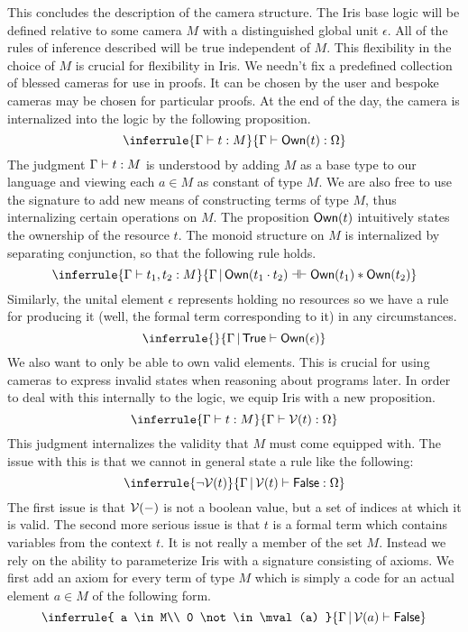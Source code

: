 \documentclass{amsart}
\newcommand{\provesJ}[3]{#1 \mathop{\vert} #2 \proves #3}
\newcommand{\provesIffJ}[3]{#1 \mathop{\vert} #2 \provesIff #3}
\begin{document}
This concludes the description of the camera structure. The Iris base
logic will be defined relative to some camera $M$ with a distinguished
global unit $\epsilon$. All of the rules of inference described will
be true independent of $M$. This flexibility in the choice of $M$ is
crucial for flexibility in Iris. We needn't fix a predefined
collection of blessed cameras for use in proofs. It can be chosen by
the user and bespoke cameras may be chosen for particular proofs. At
the end of the day, the camera is internalized into the logic by the
following proposition.
\[
  \inferrule{
    \Gamma \proves t : M
  }{\Gamma \proves \ownM{t} : \Omega}
\]
The judgment $\Gamma \vdash t : M$ is understood by adding $M$ as a
base type to our language and viewing each $a \in M$ as constant of
type $M$. We are also free to use the signature to add new means of
constructing terms of type $M$, thus internalizing certain operations
on $M$. The proposition $\textsf{Own}(t)$ intuitively states the ownership of
the resource $t$. The monoid structure on $M$ is internalized by
separating conjunction, so that the following rule holds.
\[
  \inferrule{
    \Gamma \proves t_1, t_2 : M
  }{\provesIffJ{\Gamma}{\ownM{t_1 \cdot t_2}}{\ownM{t_1} \sep \ownM{t_2}}}
\]
Similarly, the unital element $\epsilon$ represents holding no
resources so we have a rule for producing it (well, the formal term
corresponding to it) in any circumstances.
\[
  \inferrule{ }{\provesJ{\Gamma}{\TRUE}{\ownM{\epsilon}}}
\]
We also want to only be able to own valid elements. This is crucial
for using cameras to express invalid states when reasoning about
programs later. In order to deal with this internally to the logic,
we equip Iris with a new proposition.
\[
  \inferrule{
    \Gamma \proves t : M
  }{\Gamma \proves \mval(t) : \Omega}
\]
This judgment internalizes the validity that $M$ must come equipped
with. The issue with this is that we cannot in general state a rule
like the following:
\[
  \inferrule{
    \neg \mval(t)
  }{\provesJ{\Gamma}{\mval(t)}{\FALSE} : \Omega}
\]
The first issue is that $\mathcal{V}(-)$ is not a boolean value, but a set
of indices at which it is valid. The second more serious issue is that
$t$ is a formal term which contains variables from the context $t$. It
is not really a member of the set $M$. Instead we rely on the ability
to parameterize Iris with a signature consisting of axioms. We first
add an axiom for every term of type $M$ which is simply a code for an
actual element $a \in M$ of the following form.
\[
  \inferrule{
    a \in M\\
    0 \not\in \mval(a)
  }{\provesJ{\Gamma}{\mval(a)}{\FALSE}}
\]
\end{document}

